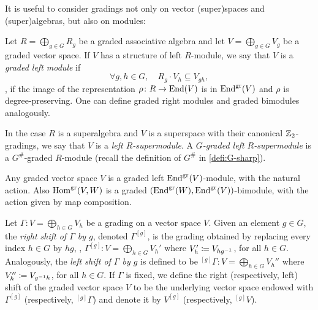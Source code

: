 It is useful to consider gradings not only on vector (super)spaces and (super)algebras, but also on modules:

\begin{defi}\label{defi:grdModule}
    Let $R = \bigoplus_{g\in G} R_g$ be a graded associative algebra and let $V = \bigoplus_{g\in G} V_g$ be a graded vector space. 
    If $V$ has a structure of left $R$-module, we say that $V$ is a \emph{graded left module} if 
    \[
        \forall g,h \in G, \quad R_g \cdot V_h \subseteq V_{gh},
    \]
    \ie, if the image of the representation $\rho\colon R \to \operatorname{End}(V)$ is in $\operatorname{End}^{\textrm{gr}}(V)$ and $\rho$ is degree-preserving. 
    One can define graded right modules and graded bimodules analogously. 
\end{defi}

In the case $R$ is a superalgebra and $V$ is a superspace with their canonical $\mathbb{Z}_2$-gradings, we say that $V$ is a \emph{left $R$-supermodule}. 
A \emph{$G$-graded left $R$-supermodule} is a $G^\#$-graded $R$-module (recall the definition of $G^\#$ in \cref{defi:G-sharp}).

\begin{ex}
    Any graded vector space $V$ is a graded left $\operatorname{End}^{\textrm{gr}}(V)$-module, with the natural action. 
    Also $\operatorname{Hom}^{\textrm{gr}}(V, W)$ is a graded $(\operatorname{End}^{\textrm{gr}}(W),\operatorname{End}^{\textrm{gr}}(V))$-bimodule, with the action given by map composition. 
\end{ex}




\begin{defi}
    Let $\Gamma: V = \bigoplus_{h\in G} V_h$ be a grading on a vector space $V$. 
    Given an element $g\in G$, the \emph{right shift of $\Gamma$ by $g$}, denoted $\Gamma^{[g]}$, is the grading obtained by replacing every index $h \in G$ by $hg$, \ie, $\Gamma^{[g]} : V = \bigoplus_{h\in G} V_h'$ where $V_{h}' \coloneqq V_{h g^{-1}}$, for all $h\in G$. 
    Analogously, the \emph{left shift of $\Gamma$ by $g$} is defined to be ${}^{[g]}\Gamma : V = \bigoplus_{h\in G} V_h''$ where $V_{h}'' \coloneqq V_{g^{-1} h}$, for all $h\in G$. 
    If $\Gamma$ is fixed, we define the right (respectively, left) shift of the graded vector space $V$ to be the underlying vector space endowed with $\Gamma^{[g]}$ (respectively, ${}^{[g]}\Gamma$) and denote it by $V^{[g]}$ (respectively, ${}^{[g]}V$).
\end{defi}

